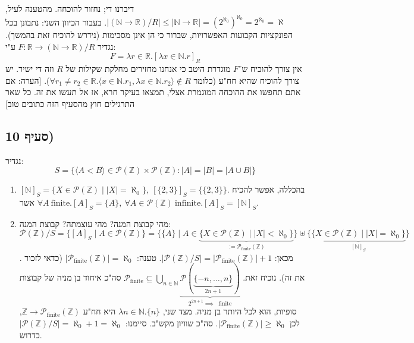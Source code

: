 \documentclass[]{article}
\newcommand\N     {\mathbb{N}}
\newcommand\Z     {\mathbb{Z}}
\newcommand\R     {\mathbb{R}}
\newcommand\ps    {\mathcal{P}}
\newcommand\ra    {\rangle}
\newcommand\la    {\langle}
\newcommand\az    {\aleph_0}
\newcommand\uaz   {^{\aleph_0}}
\newcommand\al    {\aleph}
\newcommand\taz   {2^{\aleph_0}}
\begin{document}
\begin{enumerate}[(a)]
		דיברנו די; נחזור להוכחה. מהטענה לעיל, $ |(\N \to \R) / R| \le |\N \to \R| = (\taz)\uaz = \taz = \al $. בעבור הכיוון השני: נתבונן בכל הפונקציות הקבועות האפשרויות, שברור כי הן אינן מסכימות (נידרש להוכיח זאת בהמשך). נגדיר $ F \colon \R\to (\N \to \R) / R $ ע"י: 
		\[ F = \lambda r \in \R. [\lambda x \in \N. r]_R \]
		אין צורך להוכיח ש־$ F $ מוגדרת היטב כי אנחנו מחזירים מחלקת שקילות של $ R $ וזה די ישיר. יש צורך להוכיח שהיא חח"ע (כלומר $ \forall r_1 \neq r_2 \in \R. \la x \in \N. r_1, \lambda x \in \N. r_2 \ra \not \in R $). 
		[הערה: אם אתם תחפשו את ההוכחה המוגמרת אצלי, תמצאו בעיקר חרא, אז אל תעשו את זה. כל שאר התרגילים חוץ מהסעיף הזה כתובים טוב]
	\end{enumerate}
	\subsection{סעיף 10)}
	נגדיר: 
	\[ S = \{\la A< B \ra \in \ps(\Z) \times \ps(\Z) \colon |A| = |B| = |A \cup B| \} \]
	\begin{enumerate}
		\item $ [\N]_S = \{X \in \ps(\Z) \mid |X| = \az\}, \ [\{2, 3\}]_S = \big \{\{2, 3\}\big \} $. בהכללה, אפשר להכיח אשר $ \forall A \ \text{finite}. [A]_S = \{A\}, \ \forall A \in \ps(\Z) \ \text{infinite}. [A]_S = [\N]_S $. 
		\item מהי קבוצת המנה? מהי עוצמתה? קבוצת המנה: 
		\[ \ps(\Z) / S = \{[A]_S \mid A \in \ps(\Z)\} = \big\{ \{A\} \mid A \in \underbrace{\{X \in \ps(\Z) \mid |X| < \az\}}_{:=\ps_{\textrm{finite}}(\Z)} \big\} \uplus \big\{ \underbrace{\{X \in \ps(\Z) \mid |X| = \az\}}_{[\N]_S}\big\} \]. מכאן: $ |\ps(\Z) / S| = |\ps_{\textrm{finite}}(\Z)| + 1 $. טענה: $ |\ps_{\textrm{finite}}(\Z)| = \az $ (כדאי לזכור את זה). נוכיח זאת. $ \ps_{\textrm{finite}} \subseteq \bigcup_{n \in \N}\underbrace{\ps(\underbrace{\{-n, \dots, n\}}_{2n + 1})}_{2^{2n + 1}\implies \ \text{ finite}} $
		סה"כ איחוד בן מניה של קבוצות סופיות, הוא לכל היותר בן מניה. מצד שני, $ \lambda n \in \N. \{n\} $ היא חח"ע $ \Z\to \ps_{\textrm{finite}}(\Z) $, לכן $ |\ps_{\textrm{finite}}(\Z)| \ge \az $. סה"כ שוויון מקש"ב. סיימנו: $ |\ps(\Z) / S| = \az + 1 = \az $ כדרוש. 
	\end{enumerate}
\end{document}

